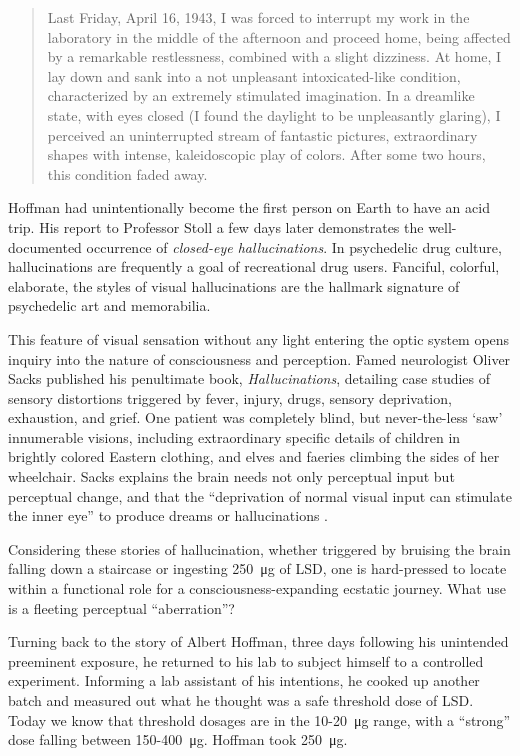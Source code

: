 \documentclass{UIdahoMastersThesis}
\begin{document}
\begin{quote}
{Last Friday, April 16, 1943, I was forced to interrupt my work in the laboratory in the middle of the afternoon and proceed home, being affected by a remarkable restlessness, combined with a slight dizziness. At home, I lay down and sank into a not unpleasant intoxicated-like condition, characterized by an extremely stimulated imagination. In a dreamlike state, with eyes closed (I found the daylight to be unpleasantly glaring), I perceived an uninterrupted stream of fantastic pictures, extraordinary shapes with intense, kaleidoscopic play of colors. After some two hours, this condition faded away.}\cite{hofmann_lsd:_1980}
\end{quote}

Hoffman had unintentionally become the first person on Earth to have an acid trip. His report to Professor Stoll a few days later demonstrates the well-documented occurrence of \emph{closed-eye hallucinations}. In psychedelic drug culture, hallucinations are frequently a goal of recreational drug users. Fanciful, colorful, elaborate, the styles of visual hallucinations are the hallmark signature of psychedelic art and memorabilia. 

This feature of visual sensation without any light entering the optic system opens inquiry into the nature of consciousness and perception. Famed neurologist Oliver Sacks published his penultimate book, \emph{Hallucinations}, detailing case studies of sensory distortions triggered by fever, injury, drugs, sensory deprivation, exhaustion, and grief. One patient was completely blind, but never-the-less `saw' innumerable visions, including extraordinary specific details of children in brightly colored Eastern clothing, and elves and faeries climbing the sides of her wheelchair. Sacks explains the brain needs not only perceptual input but perceptual change, and that the ``deprivation of normal visual input can stimulate the inner eye'' to produce dreams or hallucinations \cite{sacks_hallucinations_2012}.

Considering these stories of hallucination, whether triggered by bruising the brain falling down a staircase or ingesting \SI{250}{\micro\gram} of LSD, one is hard-pressed to locate within a functional role for a consciousness-expanding ecstatic journey. What use is a fleeting perceptual ``aberration''?

Turning back to the story of Albert Hoffman, three days following his unintended preeminent exposure, he returned to his lab to subject himself to a controlled experiment. Informing a lab assistant of his intentions, he cooked up another batch and measured out what he thought was a safe threshold dose of LSD. Today we know that threshold dosages are in the 10-\SI{20}{\micro\gram} range, with a ``strong'' dose falling between 150-\SI{400}{\micro\gram}. Hoffman took \SI{250}{\micro\gram}.
\end{document}
